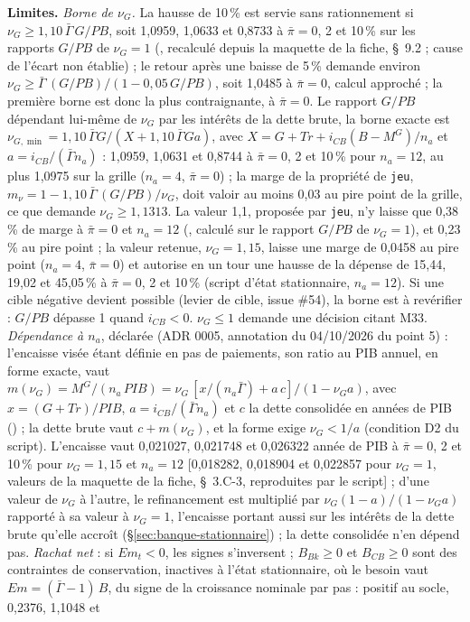 \documentclass[11pt,a4paper]{article}
\newcommand{\limites}{\par\noindent\textbf{Limites.} }
\newcommand{\barre}[1]{\leavevmode\sbox{\boitebarre}{#1}\rlap{\rule[0.6ex]{\wd\boitebarre}{0.4pt}}\usebox{\boitebarre}}
\begin{document}
\begin{proposee}
\limites \emph{Borne de $\nu_G$.} La hausse de 10\,\% est servie sans rationnement si $\nu_G \ge 1{,}10\,\bar\Gamma\,G/\mathit{PB}$, soit 1,0959, 1,0633 et 0,8733 à $\bar\pi = 0$, 2 et 10\,\% sur les rapports $G/\mathit{PB}$ de $\nu_G = 1$ (\barre{0,8734}, recalculé depuis la maquette de la fiche, \S~9.2 ; cause de l'écart non établie) ; le retour après une baisse de 5\,\% demande environ $\nu_G \ge \bar\Gamma\,(G/\mathit{PB})/(1 - 0{,}05\,G/\mathit{PB})$, soit 1,0485 à $\bar\pi = 0$, calcul approché ; la première borne est donc la plus contraignante, à $\bar\pi = 0$. Le rapport $G/\mathit{PB}$ dépendant lui-même de $\nu_G$ par les intérêts de la dette brute, la borne exacte est $\nu_{G,\min} = 1{,}10\,\bar\Gamma G/(X + 1{,}10\,\bar\Gamma G a)$, avec $X = G + \mathit{Tr} + i_{\mathit{CB}}(B - M^G)/n_a$ et $a = i_{\mathit{CB}}/(\bar\Gamma n_a)$ : 1,0959, 1,0631 et 0,8744 à $\bar\pi = 0$, 2 et 10\,\% pour $n_a = 12$, au plus 1,0975 sur la grille ($n_a = 4$, $\bar\pi = 0$) ; la marge de la propriété de \texttt{jeu}, $m_\nu = 1 - 1{,}10\,\bar\Gamma\,(G/\mathit{PB})/\nu_G$, doit valoir au moins 0,03 au pire point de la grille, ce que demande $\nu_G \ge 1{,}1313$. La valeur 1,1, proposée par \texttt{jeu}, n'y laisse que 0,38\,\% de marge à $\bar\pi = 0$ et $n_a = 12$ (\barre{0,37\,\%}, calculé sur le rapport $G/\mathit{PB}$ de $\nu_G = 1$), et 0,23\,\% au pire point ; la valeur retenue, $\nu_G = 1{,}15$, laisse une marge de 0,0458 au pire point ($n_a = 4$, $\bar\pi = 0$) et autorise en un tour une hausse de la dépense de 15,44, 19,02 et 45,05\,\% à $\bar\pi = 0$, 2 et 10\,\% (script d'état stationnaire, $n_a = 12$). Si une cible négative devient possible (levier de cible, issue \#54), la borne est à revérifier : $G/\mathit{PB}$ dépasse 1 quand $i_{\mathit{CB}} < 0$. $\nu_G \le 1$ demande une décision citant M33. \emph{Dépendance à $n_a$}, déclarée (ADR 0005, annotation du 04/10/2026 du point 5) : l'encaisse visée étant définie en pas de paiements, son ratio au PIB annuel, en forme exacte, vaut $m(\nu_G) = M^G/(n_a\,\mathit{PIB}) = \nu_G\,[x/(n_a\bar\Gamma) + a\,c]/(1 - \nu_G a)$, avec $x = (G + \mathit{Tr})/\mathit{PIB}$, $a = i_{\mathit{CB}}/(\bar\Gamma n_a)$ et $c$ la dette consolidée en années de PIB (\barre{environ $\nu_G\,(\mathit{PB}/\mathit{PIB})/n_a$}) ; la dette brute vaut $c + m(\nu_G)$, et la forme exige $\nu_G < 1/a$ (condition D2 du script). L'encaisse vaut 0,021027, 0,021748 et 0,026322 année de PIB à $\bar\pi = 0$, 2 et 10\,\% pour $\nu_G = 1{,}15$ et $n_a = 12$ [0,018282, 0,018904 et 0,022857 pour $\nu_G = 1$, valeurs de la maquette de la fiche, \S~3.C-3, reproduites par le script] ; d'une valeur de $\nu_G$ à l'autre, le refinancement est multiplié par $\nu_G(1 - a)/(1 - \nu_G a)$ rapporté à sa valeur à $\nu_G = 1$, l'encaisse portant aussi sur les intérêts de la dette brute qu'elle accroît (\S\ref{sec:banque-stationnaire}) ; la dette consolidée n'en dépend pas. \emph{Rachat net} : si $\mathit{Em}_t < 0$, les signes s'inversent ; $B_{\mathit{Bk}} \ge 0$ et $B_{\mathit{CB}} \ge 0$ sont des contraintes de conservation, inactives à l'état stationnaire, où le besoin vaut $\mathit{Em} = (\bar\Gamma - 1)\,B$, du signe de la croissance nominale par pas : positif au socle, 0,2376, 1,1048 et 
\end{proposee}
\end{document}

